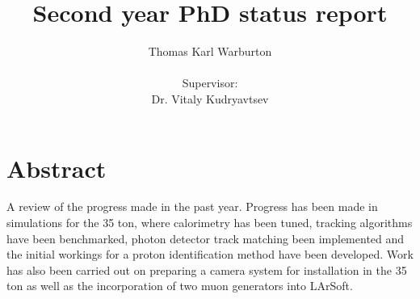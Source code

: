 \documentclass[11pt]{report} %
\title{\Huge Second year PhD status report}
\author{\LARGE Thomas Karl Warburton\\ \\ \normalsize Supervisor:\\Dr. Vitaly Kudryavtsev}
\begin{document}
\renewcommand{\thesection}{\arabic{section}}
\renewcommand\bibname{References}
\maketitle

\tableofcontents

\newpage 

\section*{Abstract}
A review of the progress made in the past year. Progress has been made in simulations for the 35 ton, where calorimetry has been tuned, tracking algorithms have been benchmarked, photon detector track matching been implemented and the initial workings for a proton identification method have been developed. Work has also been carried out on preparing a camera system for installation in the 35 ton as well as the incorporation of two muon generators into LArSoft. 
\end{document}
